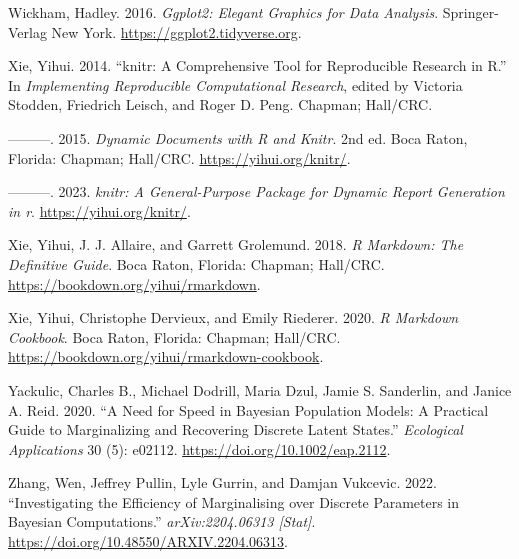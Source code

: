 \begin{CSLReferences}{1}{0}
\leavevmode{}%
Wickham, Hadley. 2016. \emph{Ggplot2: Elegant Graphics for Data Analysis}. Springer-Verlag New York. \url{https://ggplot2.tidyverse.org}.

\leavevmode{}%
Xie, Yihui. 2014. {``{knitr}: A Comprehensive Tool for Reproducible Research in {R}.''} In \emph{Implementing Reproducible Computational Research}, edited by Victoria Stodden, Friedrich Leisch, and Roger D. Peng. Chapman; Hall/CRC.

\leavevmode{}%
---------. 2015. \emph{Dynamic Documents with {R} and Knitr}. 2nd ed. Boca Raton, Florida: Chapman; Hall/CRC. \url{https://yihui.org/knitr/}.

\leavevmode{}%
---------. 2023. \emph{{knitr}: A General-Purpose Package for Dynamic Report Generation in r}. \url{https://yihui.org/knitr/}.

\leavevmode{}%
Xie, Yihui, J. J. Allaire, and Garrett Grolemund. 2018. \emph{R Markdown: The Definitive Guide}. Boca Raton, Florida: Chapman; Hall/CRC. \url{https://bookdown.org/yihui/rmarkdown}.

\leavevmode{}%
Xie, Yihui, Christophe Dervieux, and Emily Riederer. 2020. \emph{R Markdown Cookbook}. Boca Raton, Florida: Chapman; Hall/CRC. \url{https://bookdown.org/yihui/rmarkdown-cookbook}.

\leavevmode{}%
Yackulic, Charles B., Michael Dodrill, Maria Dzul, Jamie S. Sanderlin, and Janice A. Reid. 2020. {``A Need for Speed in Bayesian Population Models: A Practical Guide to Marginalizing and Recovering Discrete Latent States.''} \emph{Ecological Applications} 30 (5): e02112. \url{https://doi.org/10.1002/eap.2112}.

\leavevmode{}%
Zhang, Wen, Jeffrey Pullin, Lyle Gurrin, and Damjan Vukcevic. 2022. {``Investigating the Efficiency of Marginalising over Discrete Parameters in {B}ayesian Computations.''} \emph{arXiv:2204.06313 {[}Stat{]}}. \url{https://doi.org/10.48550/ARXIV.2204.06313}.

\end{CSLReferences}



\address{%
Jeffrey M. Pullin\\
University of Melbourne\\%
School of Mathematics and Statistics\\ Melbourne, Australia\\
%
%
\textit{ORCiD: \href{https://orcid.org/0000-0003-3651-5471}{0000-0003-3651-5471}}\\%
%
}

